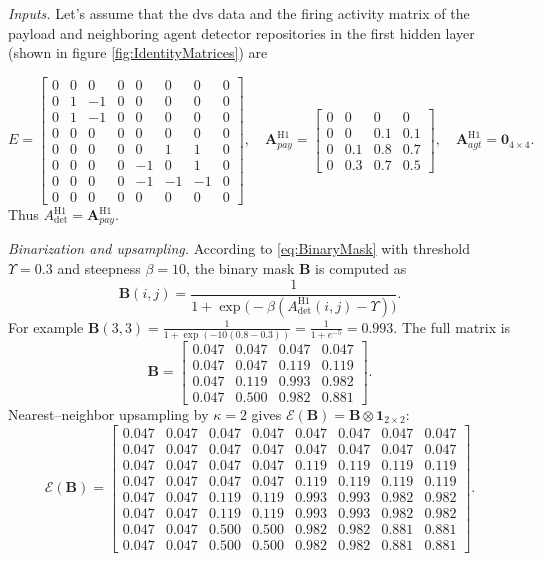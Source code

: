 \emph{Inputs.}
Let's assume that the \ac{dvs} data and the firing activity matrix of the payload and neighboring agent detector repositories in the first hidden layer (shown in figure \ref{fig:IdentityMatrices}) are

\[
E=
\begin{bmatrix}
0&0&0&0&0&0&0&0\\
0&1&-1&0&0&0&0&0\\
0&1&-1&0&0&0&0&0\\
0&0&0&0&0&0&0&0\\
0&0&0&0&0&1&1&0\\
0&0&0&0&-1&0&1&0\\
0&0&0&0&-1&-1&-1&0\\
0&0&0&0&0&0&0&0
\end{bmatrix},\quad
\mathbf{A}_{pay}^{\text{H1}}=
\begin{bmatrix}
0&0&0&0\\
0&0&0.1&0.1\\
0&0.1&0.8&0.7\\
0&0.3&0.7&0.5
\end{bmatrix},\quad
\mathbf{A}_{agt}^{\text{H1}}=\mathbf{0}_{4\times 4}.
\]
Thus $A_{\mathrm{det}}^{\text{H1}}=\mathbf{A}_{pay}^{\text{H1}}$.

\emph{Binarization and upsampling.}
According to \eqref{eq:BinaryMask} with threshold $\Upsilon=0.3$ and steepness $\beta=10$, the binary mask $\mathbf{B}$ is computed as
\[
\mathbf{B}(i,j)=\frac{1}{1+\exp\!\big(-\beta(A_{\mathrm{det}}^{\text{H1}}(i,j)-\Upsilon)\big)}.
\]
For example $\mathbf{B}(3,3)=\frac{1}{1+\exp(-10(0.8-0.3))}=\frac{1}{1+e^{-5}}=0.993$.  
The full matrix is
\[
\mathbf{B}=
\begin{bmatrix}
0.047&0.047&0.047&0.047\\
0.047&0.047&0.119&0.119\\
0.047&0.119&0.993&0.982\\
0.047&0.500&0.982&0.881
\end{bmatrix}.
\]
Nearest–neighbor upsampling by $\kappa=2$ gives $\mathcal{E}(\mathbf{B})=\mathbf{B}\otimes\mathbf{1}_{2\times 2}$:
\[
\mathcal{E}(\mathbf{B})=
\begin{bmatrix}
0.047&0.047&0.047&0.047&0.047&0.047&0.047&0.047\\
0.047&0.047&0.047&0.047&0.047&0.047&0.047&0.047\\
0.047&0.047&0.047&0.047&0.119&0.119&0.119&0.119\\
0.047&0.047&0.047&0.047&0.119&0.119&0.119&0.119\\
0.047&0.047&0.119&0.119&0.993&0.993&0.982&0.982\\
0.047&0.047&0.119&0.119&0.993&0.993&0.982&0.982\\
0.047&0.047&0.500&0.500&0.982&0.982&0.881&0.881\\
0.047&0.047&0.500&0.500&0.982&0.982&0.881&0.881
\end{bmatrix}.
\]


